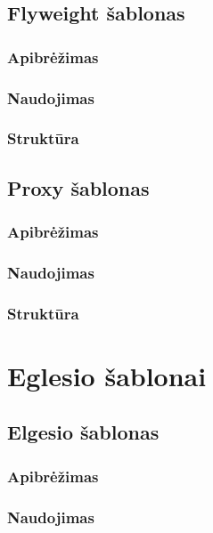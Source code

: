 \documentclass[10pt]{IEEEtran}
\begin{document}
		\subsection{Flyweight šablonas}

			\subsubsection{Apibrėžimas}

			\subsubsection{Naudojimas}

			\subsubsection{Struktūra}

		\subsection{Proxy šablonas}

			\subsubsection{Apibrėžimas}

			\subsubsection{Naudojimas}

			\subsubsection{Struktūra}
		
	\section{Eglesio šablonai}

		\subsection{Elgesio šablonas}

			\subsubsection{Apibrėžimas}

			\subsubsection{Naudojimas}
\end{document}
